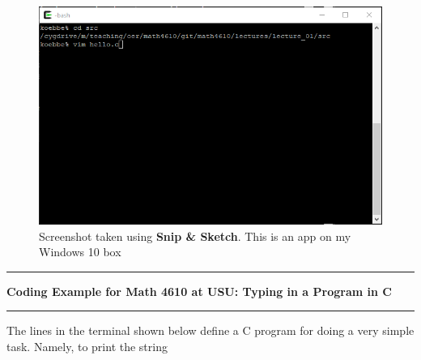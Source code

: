 \documentclass[10pt,fleqn]{article}
\begin{document}
\begin{figure}[h]
\centering
\includegraphics{../images/coding_02.png}
\caption{{Screenshot} taken using {\bf Snip \& Sketch}. This is an app on
         my Windows 10 box}
\end{figure}
\eject
\vskip0.1in\hrule\vskip0.1in
\noindent
{\bf Coding Example for Math 4610 at USU: Typing in a Program in C} 
\vskip0.1in\hrule\vskip0.1in
\noindent
The lines in the terminal shown below define a C program for doing a very simple
task. Namely, to print the string
\end{document}
